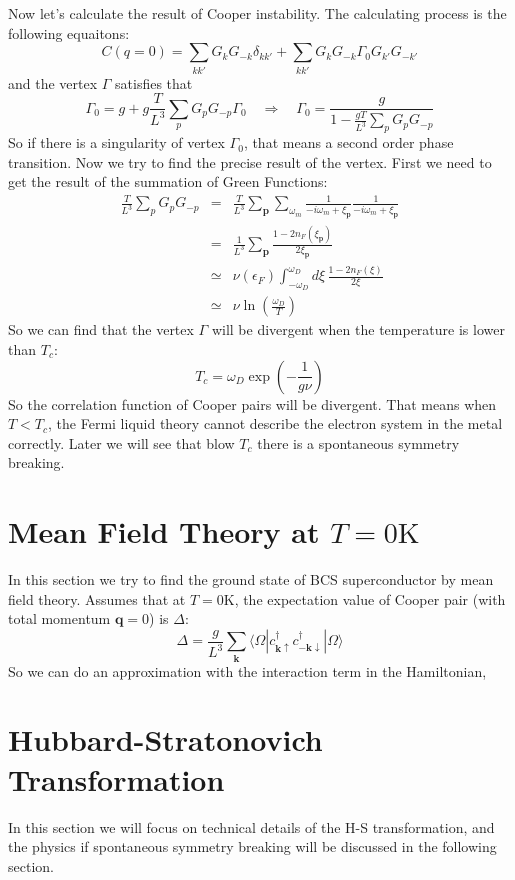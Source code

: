 \documentclass{article}
\newcommand{\mtp}{\mathbf{p}}
\newcommand{\mtq}{\mathbf{q}}
\newcommand{\mtk}{\mathbf{k}}
\newcommand{\uspin}{\uparrow}
\newcommand{\dspin}{\downarrow}
\begin{document}
Now let's calculate the result of Cooper instability. The calculating process is the following equaitons:
\begin{equation}
C(q=0) =\sum_{kk'} G_k G_{-k}\delta_{kk'} + \sum_{kk'}G_{k}G_{-k}\Gamma_0 G_{k'}G_{-k'}
\end{equation}
and the vertex $\Gamma$ satisfies that
$$
\Gamma_0 = g + g\frac{T}{L^3}\sum_{p}G_{p}G_{-p}\Gamma_0 \quad\Rightarrow\quad \Gamma_0 = \frac{g}{1-\frac{gT}{L^3}\sum_{p}G_p G_{-p}}
$$
So if there is a singularity of vertex $\Gamma_0$, that means a second order phase transition. Now we try to find the precise result of the vertex. First we need to get the result of the summation of Green Functions:
\begin{eqnarray}
\frac{T}{L^3}\sum_p G_p G_{-p} &=& \frac{T}{L^3}\sum_{\mtp}\sum_{\omega_m}\frac{1}{-i\omega_m +\xi_\mtp}\frac{1}{-i\omega_m + \xi_\mtp}\nonumber\\
&=& \frac{1}{L^3}\sum_\mtp \frac{1-2n_F(\xi_\mtp)}{2\xi_\mtp}\nonumber\\
&\simeq&\nu(\epsilon_F)\int_{-\omega_D}^{\omega_D}d\xi\,\frac{1-2n_F(\xi)}{2\xi}\nonumber\\
&\simeq& \nu \ln\left(\frac{\omega_D}{T}\right)
\end{eqnarray}
So we can find that the vertex $\Gamma$ will be divergent when the temperature is lower than $T_c$:
$$
T_c = \omega_D \exp\left(-\frac{1}{g\nu}\right)
$$
So the correlation function of Cooper pairs will be divergent. That means when $T<T_c$, the Fermi liquid theory cannot describe the electron system in the metal correctly. Later we will see that blow $T_c$ there is a spontaneous symmetry breaking.  

\section{Mean Field Theory at $T = 0\mathrm{K}$}
In this section we try to find the ground state of BCS superconductor by mean field theory. Assumes that at $T= 0 \mathrm{K}$, the expectation value of Cooper pair (with total momentum $\mtq = 0 $) is $\Delta$:
\begin{equation}
\Delta = \frac{g}{L^3}\sum_{\mtk}\langle \Omega | c^\dagger_{\mtk \uspin}c^\dagger_{-\mtk \dspin}| \Omega \rangle
\end{equation}
So we can do an approximation with the interaction term in the Hamiltonian, 

\section{Hubbard-Stratonovich Transformation}
In this section we will focus on technical details of the H-S transformation, and the physics if spontaneous symmetry breaking will be discussed in the following section.
\end{document}
